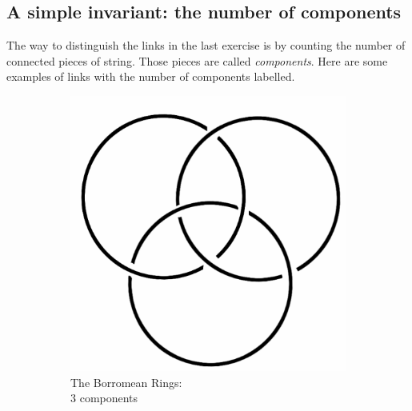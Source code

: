 \documentclass[12pt,letterpaper]{article}
\theoremstyle{definition}
\begin{document}
\subsection*{A simple invariant: the number of components}

The way to distinguish the links in the last exercise is by counting the number of connected pieces of string.
Those pieces are called \emph{components}.
Here are some examples of links with the number of components labelled.

\begin{figure}[h]
    \centering
    \begin{subfigure}{.3\textwidth}
        \centering
        \includegraphics[width=\textwidth]{knotpics/borromean.png}
        \caption{The Borromean Rings:\\ \phantom{space} 3 components}
    \end{subfigure}
    \quad
    \begin{subfigure}{.3\textwidth}
        \centering

\end{subfigure}
\end{figure}
\end{document}
